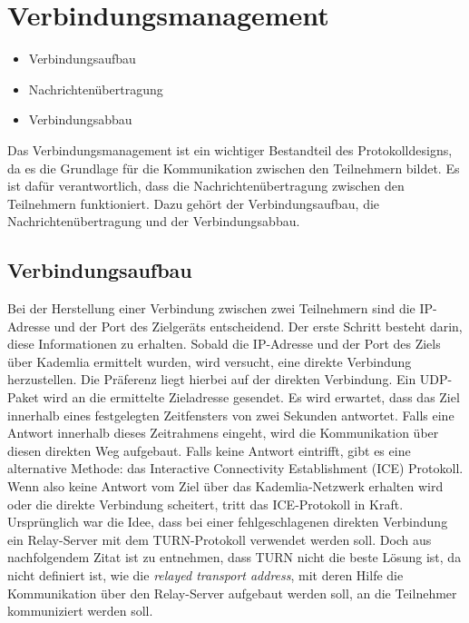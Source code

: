 \section{Verbindungsmanagement}
\label{subsec:verbindungsmanagement}

\begin{itemize}
    \item Verbindungsaufbau
    \item Nachrichtenübertragung
    \item Verbindungsabbau
\end{itemize}


\noindent Das Verbindungsmanagement ist ein wichtiger Bestandteil des Protokolldesigns, da es die Grundlage für die Kommunikation zwischen den Teilnehmern bildet. Es ist dafür verantwortlich, dass die Nachrichtenübertragung zwischen den Teilnehmern funktioniert. Dazu gehört der Verbindungsaufbau, die Nachrichtenübertragung und der Verbindungsabbau.

\subsection{Verbindungsaufbau}

Bei der Herstellung einer Verbindung zwischen zwei Teilnehmern sind die IP-Adresse und der Port des Zielgeräts entscheidend. Der erste Schritt besteht darin, diese Informationen zu erhalten. Sobald die IP-Adresse und der Port des Ziels über Kademlia ermittelt wurden, wird versucht, eine direkte Verbindung herzustellen. Die Präferenz liegt hierbei auf der direkten Verbindung. Ein UDP-Paket wird an die ermittelte Zieladresse gesendet. Es wird erwartet, dass das Ziel innerhalb eines festgelegten Zeitfensters von zwei Sekunden antwortet. Falls eine Antwort innerhalb dieses Zeitrahmens eingeht, wird die Kommunikation über diesen direkten Weg aufgebaut. Falls keine Antwort eintrifft, gibt es eine alternative Methode: das Interactive Connectivity Establishment (ICE) Protokoll. Wenn also keine Antwort vom Ziel über das Kademlia-Netzwerk erhalten wird oder die direkte Verbindung scheitert, tritt das ICE-Protokoll in Kraft.
Ursprünglich war die Idee, dass bei einer fehlgeschlagenen direkten Verbindung ein Relay-Server mit dem TURN-Protokoll verwendet werden soll. Doch aus nachfolgendem Zitat ist zu entnehmen, dass TURN nicht die beste Lösung ist, da nicht definiert ist, wie die \textit{relayed transport address}, mit deren Hilfe die Kommunikation über den Relay-Server aufgebaut werden soll, an die Teilnehmer kommuniziert werden soll.


